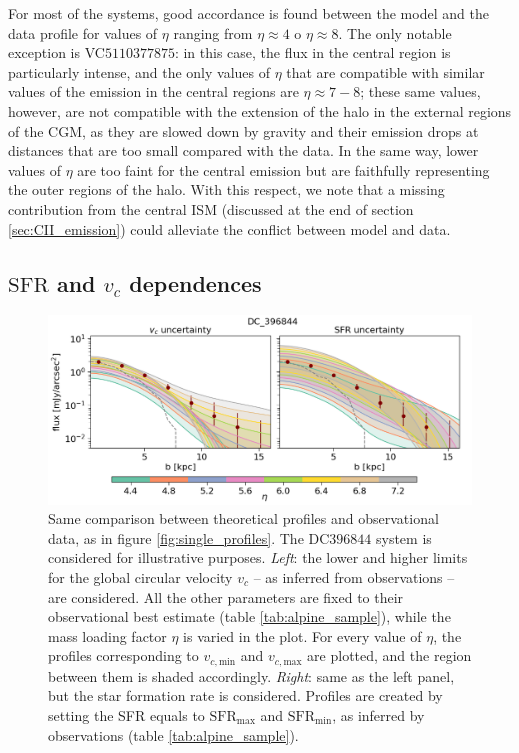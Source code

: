 For most of the systems, good accordance is found between the model and the data profile for values of $\eta$ ranging from $\eta\approx 4$ o $\eta \approx 8$.
%
The only notable exception is VC$5110377875$: in this case, the flux in the central region is particularly intense, and the only values of $\eta$ that are compatible with similar values of the emission in the central regions are $\eta \approx 7-8$; these same values, however, are not compatible with the extension of the halo in the external regions of the CGM, as they are slowed down by gravity and their emission drops at distances that are too small compared with the data. In the same way, lower values of $\eta$ are too faint for the central emission but are faithfully representing the outer regions of the halo. With this respect, we note that a missing contribution from the central ISM (discussed at the end of section \ref{sec:CII_emission}) could alleviate the conflict between model and data. 

\subsection{$\mathrm{SFR}$ and $v_c$ dependences}

\begin{figure}
    \centering
    \includegraphics[width=1.0\textwidth]{plots/vc_sfr_emission.png}
    \caption{Same comparison between theoretical profiles and observational data, as in figure \ref{fig:single_profiles}. The DC$396844$ system is considered for illustrative purposes. \textit{Left}: the lower and higher limits for the global circular velocity $v_c$ -- as inferred from observations -- are considered. All the other parameters are fixed to their observational best estimate (table \ref{tab:alpine_sample}), while the mass loading factor $\eta$ is varied in the plot. For every value of $\eta$, the profiles corresponding to $v_{c,\mathrm{min}}$ and $v_{c,\mathrm{max}}$ are plotted, and the region between them is shaded accordingly. \textit{Right}: same as the left panel, but the star formation rate is considered. Profiles are created by setting the SFR equals to $\mathrm{SFR}_\mathrm{max}$ and $\mathrm{SFR}_\mathrm{min}$, as inferred by observations (table \ref{tab:alpine_sample}). 
    \label{fig:sfr_vc_unc}
    }
\end{figure}

